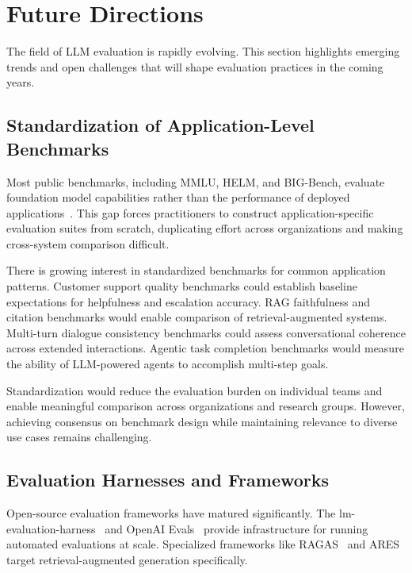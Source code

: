 
\section{Future Directions}
\label{sec:future-directions}

The field of LLM evaluation is rapidly evolving. This section highlights emerging trends and open challenges that will shape evaluation practices in the coming years.

\subsection{Standardization of Application-Level Benchmarks}

Most public benchmarks, including MMLU, HELM, and BIG-Bench, evaluate foundation model capabilities rather than the performance of deployed applications~\citep{hendrycks2021measuring, liang2023holistic, srivastava2023beyond}. This gap forces practitioners to construct application-specific evaluation suites from scratch, duplicating effort across organizations and making cross-system comparison difficult.

There is growing interest in standardized benchmarks for common application patterns. Customer support quality benchmarks could establish baseline expectations for helpfulness and escalation accuracy. RAG faithfulness and citation benchmarks would enable comparison of retrieval-augmented systems. Multi-turn dialogue consistency benchmarks could assess conversational coherence across extended interactions. Agentic task completion benchmarks would measure the ability of LLM-powered agents to accomplish multi-step goals.

Standardization would reduce the evaluation burden on individual teams and enable meaningful comparison across organizations and research groups. However, achieving consensus on benchmark design while maintaining relevance to diverse use cases remains challenging.

\subsection{Evaluation Harnesses and Frameworks}

Open-source evaluation frameworks have matured significantly. The lm-evaluation-harness~\citep{eleutherai2023lmeval} and OpenAI Evals~\citep{openai2023evals} provide infrastructure for running automated evaluations at scale. Specialized frameworks like RAGAS~\citep{es2024ragas} and ARES~\citep{saadfalcon2024ares} target retrieval-augmented generation specifically.

